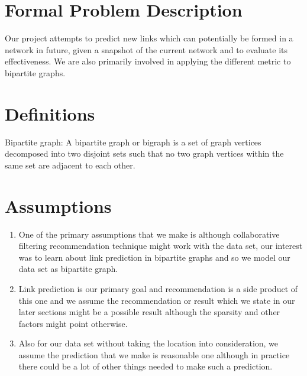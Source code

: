 \documentclass[letterpaper,twocolumn,11pt]{article}
\begin{document}

%
%

\section{Formal Problem Description}

Our project attempts to predict new links which can potentially be formed in a network in future, given a snapshot of the current network and to evaluate its effectiveness. We are also primarily involved in applying the different metric to bipartite graphs.


\section{Definitions}
Bipartite graph: A bipartite graph or bigraph is a set of graph vertices decomposed into two disjoint sets such that no two graph vertices within the same set are adjacent to each other.

\section{Assumptions}
\label{sec:assumptions}
\begin{enumerate}
\item One of the primary assumptions that we make is although collaborative filtering recommendation technique might work with the data set, our interest was to learn about link prediction in bipartite graphs and so we model our data set as bipartite graph.
\item Link prediction is our primary goal and recommendation is a side product of this one and we assume the recommendation or result which we state in our later sections might be a possible result although the sparsity and other factors might point otherwise.
\item Also for our data set without taking the location into consideration, we assume the prediction that we make is reasonable one although in practice there could be a lot of other things needed to make such a prediction.
\end{enumerate}
\end{document}
